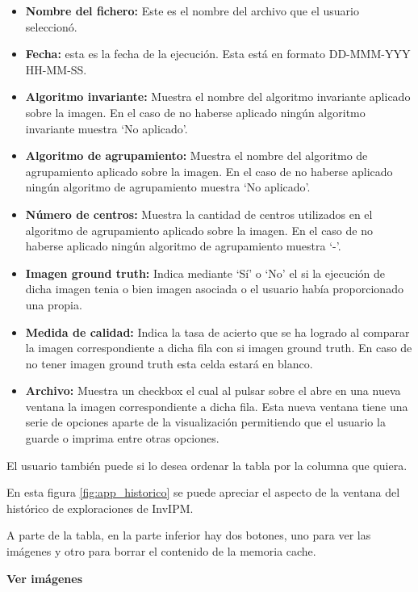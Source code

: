 \begin{itemize}
    \item \textbf{Nombre del fichero:} Este es el nombre del archivo que el usuario seleccionó.
    \item \textbf{Fecha:} esta es la fecha de la ejecución. Esta está en formato DD-MMM-YYY HH-MM-SS.
    \item \textbf{Algoritmo invariante:} Muestra el nombre del algoritmo invariante aplicado sobre la imagen. En el caso de no haberse aplicado ningún algoritmo invariante muestra `No aplicado'.
    \item \textbf{Algoritmo de agrupamiento:} Muestra el nombre del algoritmo de agrupamiento aplicado sobre la imagen. En el caso de no haberse aplicado ningún algoritmo de agrupamiento muestra `No aplicado'.
    \item \textbf{Número de centros:} Muestra la cantidad de centros utilizados en el algoritmo de agrupamiento aplicado sobre la imagen. En el caso de no haberse aplicado ningún algoritmo de agrupamiento muestra `-'.
    \item \textbf{Imagen ground truth:} Indica mediante `Sí' o `No' el si la ejecución de dicha imagen tenia o bien imagen asociada o el usuario había proporcionado una propia.
    \item \textbf{Medida de calidad:} Indica la tasa de acierto que se ha logrado al comparar la imagen correspondiente a dicha fila con si imagen ground truth. En caso de no tener imagen ground truth esta celda estará en blanco.
    \item \textbf{Archivo:} Muestra un checkbox el cual al pulsar sobre el abre en una nueva ventana la imagen correspondiente a dicha fila. Esta nueva ventana tiene una serie de opciones aparte de la visualización permitiendo que el usuario la guarde o imprima entre otras opciones.
\end{itemize}

El usuario también puede si lo desea ordenar la tabla por la columna que quiera.


En esta figura \ref{fig:app_historico} se puede apreciar el aspecto de la ventana del histórico de exploraciones de InvIPM.

A parte de la tabla, en la parte inferior hay dos botones, uno para ver las imágenes y otro para borrar el contenido de la memoria cache. 

\textbf{Ver imágenes}\label{ver-imágenes}

